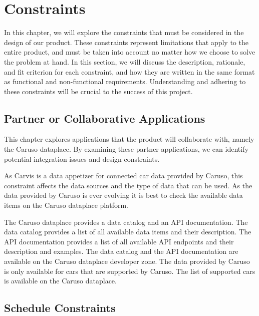 \chapter{Constraints}

In this chapter, we will explore the constraints that must be considered in the design of our product. These constraints represent limitations that apply to the entire product, and must be taken into account no matter how we choose to solve the problem at hand. In this section, we will discuss the description, rationale, and fit criterion for each constraint, and how they are written in the same format as functional and non-functional requirements. Understanding and adhering to these constraints will be crucial to the success of this project.

\section{Partner or Collaborative Applications}

This chapter explores applications that the product will collaborate with, namely the Caruso dataplace. By examining these partner applications, we can identify potential integration issues and design constraints.

As Carvis is a data appetizer for connected car data provided by Caruso, this constraint affects the data sources and the type of data that can be used. As the data provided by Caruso is ever evolving it is best to check the available data items on the Caruso dataplace platform. 

The Caruso dataplace provides a data catalog and an API documentation. The data catalog provides a list of all available data items and their description. The API documentation provides a list of all available API endpoints and their description and examples. The data catalog and the API documentation are available on the Caruso dataplace developer zone. The data provided by Caruso is only available for cars that are supported by Caruso. The list of supported cars is available on the Caruso dataplace.

\section{Schedule Constraints}

